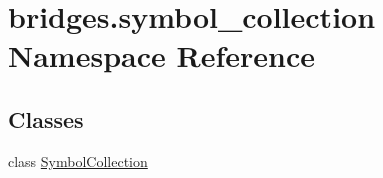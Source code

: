 \hypertarget{namespacebridges_1_1symbol__collection}{}\section{bridges.\+symbol\+\_\+collection Namespace Reference}
\label{namespacebridges_1_1symbol__collection}
\subsection*{Classes}
\begin{DoxyCompactItemize}
\item 
class \hyperlink{classbridges_1_1symbol__collection_1_1_symbol_collection}{Symbol\+Collection}
\end{DoxyCompactItemize}
